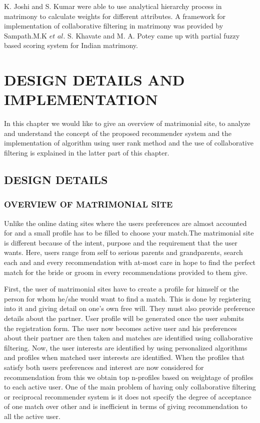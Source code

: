 \documentclass[12pt,oneside]{book}
\begin{document}
K. Joshi and S. Kumar \cite{1} were able to use analytical hierarchy process in matrimony to calculate weights for different attributes. A framework \cite{2} for implementation of collaborative filtering in matrimony was provided by Sampath.M.K $et$ $al$. S. Khavate and M. A. Potey \cite{3} came up with partial fuzzy  based scoring system for Indian matrimony.\\
\newpage
\chapter{DESIGN DETAILS AND IMPLEMENTATION}
In this chapter we would like to give an overview of matrimonial site, to analyze and understand the concept of the proposed recommender system and the implementation of algorithm using user rank method and the use of collaborative filtering is explained in the latter part of this chapter.
\section{DESIGN DETAILS}
\subsection{OVERVIEW OF MATRIMONIAL SITE}
Unlike the online dating sites where the users preferences are almost accounted for and a small profile has to be filled to choose your match.The matrimonial site is different because of the intent, purpose  and the requirement that the user wants. Here, users range from self to serious parents and grandparents, search each and and every recommendation with at-most care in hope to find the perfect match for the bride or groom in every recommendations provided to them give.

First, the user of matrimonial sites have to create a profile for himself or the person for whom he/she would want to find a match. This is done by registering into it and giving detail on one's own free will. They must also provide preference details about the partner. User profile will be generated once the user submits the registration form. The user now becomes active user and his preferences about their partner are then taken and matches are identified using collaborative filtering. Now, the user interests are identified by using personalized algorithms and profiles when matched user interests are identified. When the profiles that satisfy both users preferences and interest are now considered for recommendation from this we obtain top n-profiles based on weightage of profiles to each active user. One of the main problem of having only collaborative filtering or reciprocal recommender system is it does not specify the degree of acceptance of one match over other and is  inefficient in terms of giving recommendation to all the active user.
\end{document}
